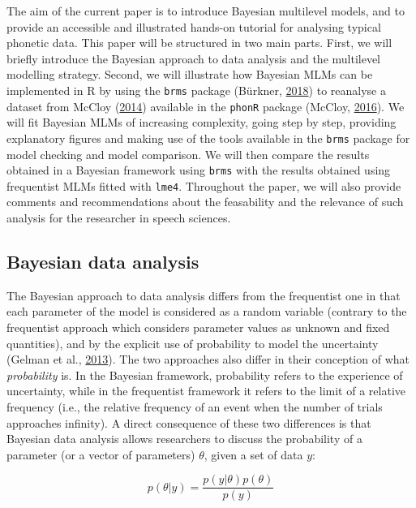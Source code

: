 \documentclass[a4paper,12pt,twoside,openright,oldfontcommands,final]{memoir}
\begin{document}
The aim of the current paper is to introduce Bayesian multilevel models, and to provide an accessible and illustrated hands-on tutorial for analysing typical phonetic data. This paper will be structured in two main parts. First, we will briefly introduce the Bayesian approach to data analysis and the multilevel modelling strategy. Second, we will illustrate how Bayesian MLMs can be implemented in R by using the \texttt{brms} package (Bürkner, \protect\hyperlink{ref-R-brms}{2018}) to reanalyse a dataset from McCloy (\protect\hyperlink{ref-mccloy_phonetic_2014}{2014}) available in the \texttt{phonR} package (McCloy, \protect\hyperlink{ref-R-phonR}{2016}). We will fit Bayesian MLMs of increasing complexity, going step by step, providing explanatory figures and making use of the tools available in the \texttt{brms} package for model checking and model comparison. We will then compare the results obtained in a Bayesian framework using \texttt{brms} with the results obtained using frequentist MLMs fitted with \texttt{lme4}. Throughout the paper, we will also provide comments and recommendations about the feasability and the relevance of such analysis for the researcher in speech sciences.

\hypertarget{bayesian-data-analysis}{%
\subsection{Bayesian data analysis}\label{bayesian-data-analysis}}

The Bayesian approach to data analysis differs from the frequentist one in that each parameter of the model is considered as a random variable (contrary to the frequentist approach which considers parameter values as unknown and fixed quantities), and by the explicit use of probability to model the uncertainty (Gelman et al., \protect\hyperlink{ref-gelman_bayesian_2013}{2013}). The two approaches also differ in their conception of what \emph{probability} is. In the Bayesian framework, probability refers to the experience of uncertainty, while in the frequentist framework it refers to the limit of a relative frequency (i.e., the relative frequency of an event when the number of trials approaches infinity). A direct consequence of these two differences is that Bayesian data analysis allows researchers to discuss the probability of a parameter (or a vector of parameters) \(\theta\), given a set of data \(y\):

\[p(\theta|y) = \frac{p(y|\theta)p(\theta)}{p(y)}\]
\end{document}
